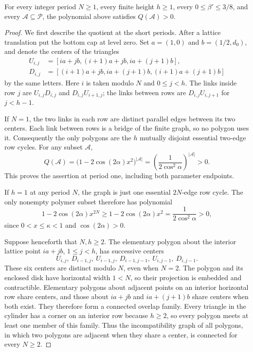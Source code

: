 \begin{auxproposition}
For every integer period $N\ge1$, every finite height $h\ge1$, every $0\le\beta'\le3/8$, and every $\mathcal A\subseteq\mathcal P$, the polynomial above satisfies $Q(\mathcal A)>0$.
\end{auxproposition}
\begin{proof}

We first describe the quotient at the short periods. After a lattice translation put the bottom cap at level zero. Set $a=(1,0)$ and $b=(1/2,d_0)$, and denote the centers of the triangles
\[
 \begin{split}
 U_{i,j}&=[ia+jb,(i+1)a+jb,ia+(j+1)b],\\
 D_{i,j}&=[(i+1)a+jb,ia+(j+1)b,(i+1)a+(j+1)b]
 \end{split}
\]
by the same letters. Here $i$ is taken modulo $N$ and $0\le j<h$. The links inside row $j$ are $U_{i,j}D_{i,j}$ and $D_{i,j}U_{i+1,j}$; the links between rows are $D_{i,j}U_{i,j+1}$ for $j<h-1$.

If $N=1$, the two links in each row are distinct parallel edges between its two centers. Each link between rows is a bridge of the finite graph, so no polygon uses it. Consequently the only polygons are the $h$ mutually disjoint essential two-edge row cycles. For any subset $\mathcal A$,
\[
 Q(\mathcal A)=\bigl(1-2\cos(2\alpha)x^2\bigr)^{|\mathcal A|}
             =\left(\frac1{2\cos^2\alpha}\right)^{|\mathcal A|}>0.
\]
This proves the assertion at period one, including both parameter endpoints.

If $h=1$ at any period $N$, the graph is just one essential $2N$-edge row cycle. The only nonempty polymer subset therefore has polynomial
\[
 1-2\cos(2\alpha)x^{2N}\ge 1-2\cos(2\alpha)x^2
 =\frac1{2\cos^2\alpha}>0,
\]
since $0<x\le\kappa<1$ and $\cos(2\alpha)>0$.

Suppose henceforth that $N,h\ge2$. The elementary polygon about the interior lattice point $ia+jb$, $1\le j<h$, has successive centers
\[
 U_{i,j},\ D_{i-1,j},\ U_{i-1,j},\ D_{i-1,j-1},\ U_{i,j-1},\ D_{i,j-1}.
\]
These six centers are distinct modulo $N$, even when $N=2$. The polygon and its enclosed disk have horizontal width $1<N$, so their projection is embedded and contractible. Elementary polygons about adjacent points on an interior horizontal row share centers, and those about $ia+jb$ and $ia+(j+1)b$ share centers when both exist. They therefore form a connected overlap family. Every triangle in the cylinder has a corner on an interior row because $h\ge2$, so every polygon meets at least one member of this family. Thus the incompatibility graph of all polygons, in which two polygons are adjacent when they share a center, is connected for every $N\ge2$.


\end{proof}
